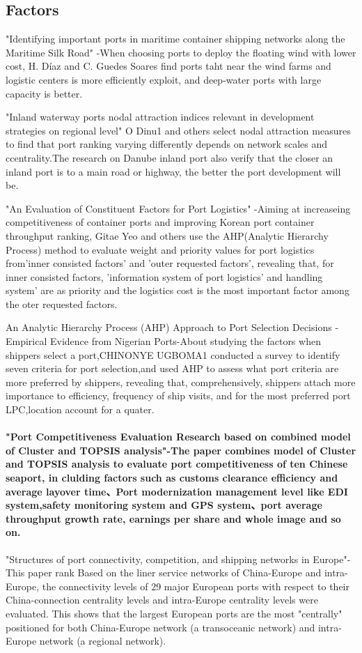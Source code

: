 \documentclass[preprint]{elsarticle}
\begin{document}
\subsection{Factors}"Identifying important ports in maritime container shipping networks along the Maritime Silk Road" -When choosing ports to deploy the floating wind with lower cost, H. Díaz  and C. Guedes Soares find ports taht near the wind farms and logistic centers is more efficiently exploit, and deep-water ports with large capacity is better. 

"Inland waterway ports nodal attraction indices relevant in development strategies on regional level"
O Dinu1 and others select nodal attraction measures to  find that port ranking varying differently depends on network scales and ccentrality.The research on Danube inland   port also verify that the closer an inland port is to a main road or highway, the better the port development will be.

"An Evaluation of Constituent Factors for Port Logistics" -Aiming at increaseing competitiveness of container ports and improving Korean port container throughput ranking, Gitae Yeo and others use the AHP(Analytic Hierarchy Process) method to evaluate weight and priority values for port logistics from'inner consisted factors' and 'outer requested factors', revealing that, for inner consisted factors, 'information system of port logistics' and handling system' are as priority and the logistics cost is the most important factor among the oter requested factors.

An Analytic Hierarchy Process (AHP) Approach to Port Selection Decisions - Empirical Evidence from Nigerian Ports-About studying the factors when shippers select a port,CHINONYE UGBOMA1 conducted a survey to identify seven criteria for port selection,and used AHP to assess what port criteria are more preferred by shippers, revealing that, comprehensively, shippers attach more importance to efficiency, frequency of ship visits, and for the most preferred port LPC,location account for a quater.

\paragraph{"Port Competitiveness Evaluation Research based on combined model of Cluster and TOPSIS analysis"-The paper combines model of Cluster and TOPSIS analysis to evaluate port competitiveness of ten Chinese seaport, in clulding factors such as customs clearance efficiency and average layover time、Port modernization  management level like EDI system,safety monitoring system and GPS system、port average throughput growth rate, earnings per share and whole image and so on.}
% 
"Structures of port connectivity, competition, and shipping networks in Europe"-This paper rank Based on the liner service networks of China-Europe and intra-Europe, the connectivity levels of 29 major European ports with respect to their China-connection centrality levels and intra-Europe centrality levels were evaluated. This shows that the largest European ports are the most "centrally" positioned for both China-Europe network (a transoceanic network) and intra-Europe network (a regional network).
\end{document}
